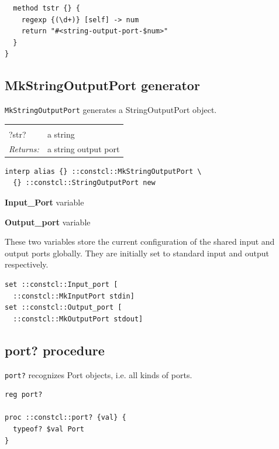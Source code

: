 \documentclass[twoside]{report}
\begin{document}
\begin{lstlisting}
  method tstr {} {
    regexp {(\d+)} [self] -> num
    return "#<string-output-port-$num>"
  }
}
\end{lstlisting}

\subsection{MkStringOutputPort generator}
\label{mkstringoutputport-generator}

\texttt{MkStringOutputPort} generates a StringOutputPort object.

\noindent\begin{tabular}{ |p{1.9cm} p{8cm}| }
\hline
\rowcolor[HTML]{CCCCCC} \multicolumn{2}{|l|}{\bf MkStringOutputPort (internal)} \\
?str? & a string \\
\textit{Returns:} & a string output port \\
\hline
\end{tabular}

\begin{lstlisting}
interp alias {} ::constcl::MkStringOutputPort \
  {} ::constcl::StringOutputPort new
\end{lstlisting}

\textbf{Input\_Port} variable

\textbf{Output\_port} variable

These two variables store the current configuration of the shared input and output ports globally. They are initially set to standard input and output respectively.

\begin{lstlisting}
set ::constcl::Input_port [
  ::constcl::MkInputPort stdin]
set ::constcl::Output_port [
  ::constcl::MkOutputPort stdout]
\end{lstlisting}

\subsection{port? procedure}
\label{port-procedure}

\texttt{port?} recognizes Port objects, i.e. all kinds of ports.

\begin{lstlisting}
reg port?

proc ::constcl::port? {val} {
  typeof? $val Port
}
\end{lstlisting}
\end{document}
